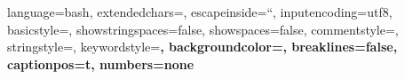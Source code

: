 
{
    language=bash,
    extendedchars=\true,
    escapeinside=``,
    inputencoding={utf8},
    basicstyle=\fontsize{10.3}{12.36}\ttfamily,
    showstringspaces=false,
    showspaces=false,
    commentstyle=\color{Turquoise},
    stringstyle=\color{Red},
    keywordstyle=\color{BlueViolet}\bfseries,
    backgroundcolor=\color{ShinyGray},
    breaklines=false,
    captionpos=t,
    numbers=none
}
